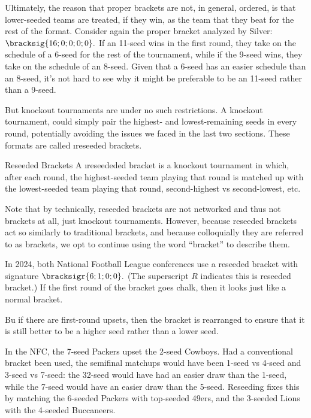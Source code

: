 {    Ultimately, the reason that proper brackets are not, in general, ordered, is that lower-seeded teams are treated, if they win, as the team that they beat for the rest of the format. Consider again the proper bracket analyzed by Silver: $\bracksig{16; 0; 0; 0; 0}.$ If an 11-seed wins in the first round, they take on the schedule of a 6-seed for the rest of the tournament, while if the 9-seed wins, they take on the schedule of an 8-seed. Given that a 6-seed has an easier schedule than an 8-seed, it's not hard to see why it might be preferable to be an 11-seed rather than a 9-seed.

    But knockout tournaments are under no such restrictions. A knockout tournament, could simply pair the highest- and lowest-remaining seeds in every round, potentially avoiding the issues we faced in the last two sections. These formats are called \i{reseeded brackets}.

    \begin{definition}{Reseeded Brackets}{}
        A \i{reseededed bracket} is a knockout tournament in which, after each round, the highest-seeded team playing that round is matched up with the lowest-seeded team playing that round, second-highest vs second-lowest, etc.
    \end{definition}

    Note that by technically, reseeded brackets are not networked and thus not brackets at all, just knockout tournaments. However, because reseeded brackets act so similarly to traditional brackets, and because colloquially they are referred to as brackets, we opt to continue using the word ``bracket'' to describe them.

    In 2024, both National Football League conferences use a reseeded bracket with signature $\bracksigr{6; 1; 0; 0}.$ (The superscript $R$ indicates this is reseeded bracket.) If the first round of the bracket goes chalk, then it looks just like a normal bracket.


    Bu if there are first-round upsets, then the bracket is rearranged to ensure that it is still better to be a higher seed rather than a lower seed.


    In the NFC, the 7-seed Packers upset the 2-seed Cowboys. Had a conventional bracket been used, the semifinal matchups would have been 1-seed vs 4-seed and 3-seed vs 7-seed: the 32-seed would have had an easier draw than the 1-seed, while the 7-seed would have an easier draw than the 5-seed. Reseeding fixes this by matching the 6-seeded Packers with top-seeded 49ers, and the 3-seeded Lions with the 4-seeded Buccaneers.

}

